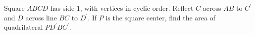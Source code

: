 Square $ABCD$ has side $1$, with vertices in cyclic order. Reflect $C$ across $AB$ to $C^{\prime}$ and $D$ across line $BC$ to $D^{\prime}$. If $P$ is the square center, find the area of quadrilateral $PD^{\prime}BC^{\prime}$.
